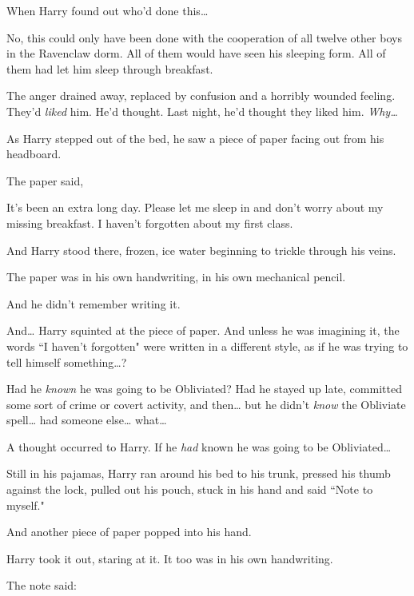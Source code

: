 When Harry found out who'd done this{\ldots}

No, this could only have been done with the cooperation of all twelve other boys in the Ravenclaw dorm. All of them would have seen his sleeping form. All of them had let him sleep through breakfast.

The anger drained away, replaced by confusion and a horribly wounded feeling. They'd \emph{liked} him. He'd thought. Last night, he'd thought they liked him. \emph{Why{\ldots}}

As Harry stepped out of the bed, he saw a piece of paper facing out from his headboard.

The paper said,

\begin{writtenNote}

It's been an extra long day. Please let me sleep in and don't worry about my missing breakfast. I haven't forgotten about my first class.

\end{writtenNote}

And Harry stood there, frozen, ice water beginning to trickle through his veins.

The paper was in his own handwriting, in his own mechanical pencil.

And he didn't remember writing it.

And{\ldots} Harry squinted at the piece of paper. And unless he was imagining it, the words ``I haven't forgotten" were written in a different style, as if he was trying to tell himself something{\ldots}?

Had he \emph{known} he was going to be Obliviated? Had he stayed up late, committed some sort of crime or covert activity, and then{\ldots} but he didn't \emph{know} the Obliviate spell{\ldots} had someone else{\ldots} what{\ldots}

A thought occurred to Harry. If he \emph{had} known he was going to be Obliviated{\ldots}

Still in his pajamas, Harry ran around his bed to his trunk, pressed his thumb against the lock, pulled out his pouch, stuck in his hand and said ``Note to myself."

And another piece of paper popped into his hand.

Harry took it out, staring at it. It too was in his own handwriting.

The note said:

